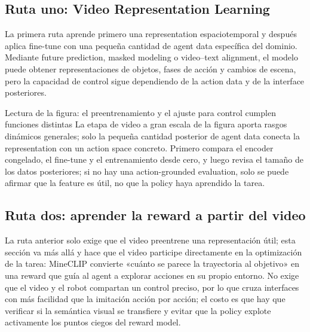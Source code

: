 
\subsection{Ruta uno: Video Representation Learning}

La primera ruta aprende primero una representation espaciotemporal y después aplica fine-tune con una pequeña cantidad de agent data específica del dominio. Mediante future prediction, masked modeling o video--text alignment, el modelo puede obtener representaciones de objetos, fases de acción y cambios de escena, pero la capacidad de control sigue dependiendo de la action data y de la interface posteriores.


\begin{knowledgebox}{Lectura de la figura: el preentrenamiento y el ajuste para control cumplen funciones distintas}
La etapa de video a gran escala de la figura aporta rasgos dinámicos generales; solo la pequeña cantidad posterior de agent data conecta la representation con un action space concreto. Primero compara el encoder congelado, el fine-tune y el entrenamiento desde cero, y luego revisa el tamaño de los datos posteriores; si no hay una action-grounded evaluation, solo se puede afirmar que la feature es útil, no que la policy haya aprendido la tarea.
\end{knowledgebox}

\subsection{Ruta dos: aprender la reward a partir del video}

La ruta anterior solo exige que el video preentrene una representación útil; esta sección va más allá y hace que el video participe directamente en la optimización de la tarea: MineCLIP convierte «cuánto se parece la trayectoria al objetivo» en una reward que guía al agent a explorar acciones en su propio entorno. No exige que el video y el robot compartan un control preciso, por lo que cruza interfaces con más facilidad que la imitación acción por acción; el costo es que hay que verificar si la semántica visual se transfiere y evitar que la policy explote activamente los puntos ciegos del reward model.

